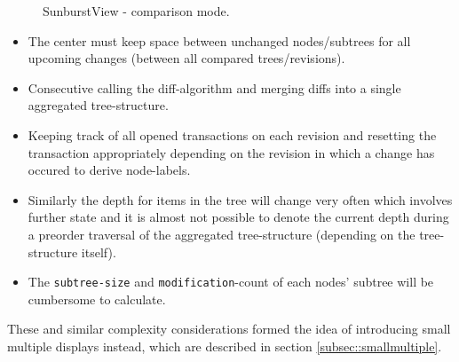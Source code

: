 \begin{figure}[tb]
\caption{\label{fig:sunburst} SunburstView - comparison mode.}
\end{figure}

\begin{itemize}
\item The center must keep space between unchanged nodes/subtrees for all upcoming changes (between all compared trees/revisions).
\item Consecutive calling the diff-algorithm and merging diffs into a single aggregated tree-structure.
\item Keeping track of all opened transactions on each revision and resetting the transaction appropriately depending on the revision in which a change has occured to derive node-labels.
\item Similarly the depth for items in the tree will change very often which involves further state and it is almost not possible to denote the current depth during a preorder traversal of the aggregated tree-structure (depending on the tree-structure itself).
\item The \texttt{subtree-size} and \texttt{modification}-count of each nodes' subtree will be cumbersome to calculate.
\end{itemize}

These and similar complexity considerations formed the idea of introducing small multiple displays instead, which are described in section \ref{subsec::smallmultiple}.

